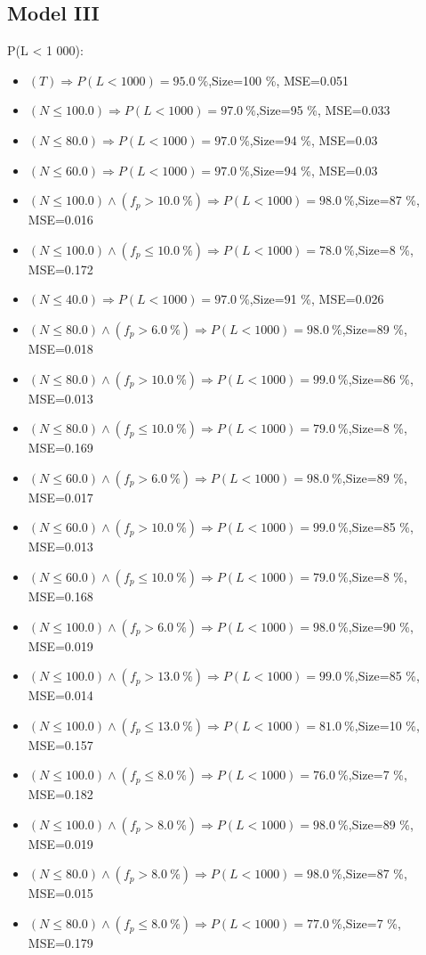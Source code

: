 \documentclass[numbered]{CSL}
\begin{document}
\subsection{Model III}
P(L < 1 000):
\begin{itemize}
\item $(T) \Rightarrow P(L < 1 000) = 95.0~\%$,\hfill Size=100 \%, MSE=0.051
\item $(N \leq 100.0) \Rightarrow P(L < 1 000) = 97.0~\%$,\hfill Size=95 \%, MSE=0.033
\item $(N \leq 80.0) \Rightarrow P(L < 1 000) = 97.0~\%$,\hfill Size=94 \%, MSE=0.03
\item $(N \leq 60.0) \Rightarrow P(L < 1 000) = 97.0~\%$,\hfill Size=94 \%, MSE=0.03
\item $(N \leq 100.0) \land (f_p > 10.0~\%) \Rightarrow P(L < 1 000) = 98.0~\%$,\hfill Size=87 \%, MSE=0.016
\item $(N \leq 100.0) \land (f_p \leq 10.0~\%) \Rightarrow P(L < 1 000) = 78.0~\%$,\hfill Size=8 \%, MSE=0.172
\item $(N \leq 40.0) \Rightarrow P(L < 1 000) = 97.0~\%$,\hfill Size=91 \%, MSE=0.026
\item $(N \leq 80.0) \land (f_p > 6.0~\%) \Rightarrow P(L < 1 000) = 98.0~\%$,\hfill Size=89 \%, MSE=0.018
\item $(N \leq 80.0) \land (f_p > 10.0~\%) \Rightarrow P(L < 1 000) = 99.0~\%$,\hfill Size=86 \%, MSE=0.013
\item $(N \leq 80.0) \land (f_p \leq 10.0~\%) \Rightarrow P(L < 1 000) = 79.0~\%$,\hfill Size=8 \%, MSE=0.169
\item $(N \leq 60.0) \land (f_p > 6.0~\%) \Rightarrow P(L < 1 000) = 98.0~\%$,\hfill Size=89 \%, MSE=0.017
\item $(N \leq 60.0) \land (f_p > 10.0~\%) \Rightarrow P(L < 1 000) = 99.0~\%$,\hfill Size=85 \%, MSE=0.013
\item $(N \leq 60.0) \land (f_p \leq 10.0~\%) \Rightarrow P(L < 1 000) = 79.0~\%$,\hfill Size=8 \%, MSE=0.168
\item $(N \leq 100.0) \land (f_p > 6.0~\%) \Rightarrow P(L < 1 000) = 98.0~\%$,\hfill Size=90 \%, MSE=0.019
\item $(N \leq 100.0) \land (f_p > 13.0~\%) \Rightarrow P(L < 1 000) = 99.0~\%$,\hfill Size=85 \%, MSE=0.014
\item $(N \leq 100.0) \land (f_p \leq 13.0~\%) \Rightarrow P(L < 1 000) = 81.0~\%$,\hfill Size=10 \%, MSE=0.157
\item $(N \leq 100.0) \land (f_p \leq 8.0~\%) \Rightarrow P(L < 1 000) = 76.0~\%$,\hfill Size=7 \%, MSE=0.182
\item $(N \leq 100.0) \land (f_p > 8.0~\%) \Rightarrow P(L < 1 000) = 98.0~\%$,\hfill Size=89 \%, MSE=0.019
\item $(N \leq 80.0) \land (f_p > 8.0~\%) \Rightarrow P(L < 1 000) = 98.0~\%$,\hfill Size=87 \%, MSE=0.015
\item $(N \leq 80.0) \land (f_p \leq 8.0~\%) \Rightarrow P(L < 1 000) = 77.0~\%$,\hfill Size=7 \%, MSE=0.179
\end{itemize}
\end{document}

